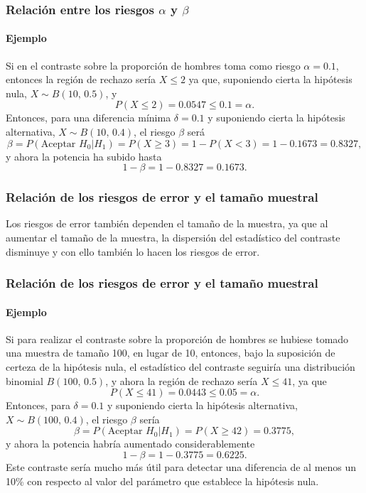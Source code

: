\begin{frame}
\frametitle{Relación entre los riesgos $\alpha$ y $\beta$}
\framesubtitle{Ejemplo}
Si en el contraste sobre la proporción de hombres toma como riesgo $\alpha=0.1$, entonces la región de rechazo sería $X\leq 2$ ya que, suponiendo cierta la hipótesis nula, $X\sim B(10,\, 0.5)$, y
\[
P(X\leq 2) = 0.0547 \leq 0.1=\alpha.
\]
Entonces, para una diferencia mínima $\delta=0.1$ y suponiendo cierta la hipótesis alternativa, $X\sim B(10,\,0.4)$, el riesgo $\beta$ será
\[
\beta = P(\text{Aceptar }H_0|H_1) = P(X\geq 3) = 1- P(X<3) = 1-0.1673 = 0.8327,
\]
y ahora la potencia ha subido hasta
\[
1-\beta = 1-0.8327 = 0.1673.
\]
\end{frame}


\begin{frame}
\frametitle{Relación de los riesgos de error y el tamaño muestral}
Los riesgos de error también dependen el tamaño de la muestra, ya que al aumentar el tamaño de la muestra, la dispersión del estadístico del contraste disminuye y con ello también lo hacen los riesgos de error.
\begin{center}
\end{center}
\end{frame}


\begin{frame}
\frametitle{Relación de los riesgos de error y el tamaño muestral}
\framesubtitle{Ejemplo}
Si para realizar el contraste sobre la proporción de hombres se hubiese tomado una muestra de tamaño 100, en lugar de 10, entonces, bajo la suposición de certeza de la hipótesis nula, el estadístico del contraste seguiría una distribución binomial $B(100,\,0.5)$, y ahora la región de rechazo sería $X\leq 41$, ya que
\[
P(X\leq 41) = 0.0443 \leq 0.05 =\alpha.
\]
Entonces, para $\delta=0.1$ y suponiendo cierta la hipótesis alternativa, $X\sim B(100,\,0.4)$, el riesgo $\beta$ sería
\[
\beta = P(\text{Aceptar }H_0|H_1) = P(X\geq 42) = 0.3775,
\]
y ahora la potencia habría aumentado considerablemente
\[
1-\beta = 1-0.3775 = 0.6225.
\]
Este contraste sería mucho más útil para detectar una diferencia de al menos un 10\% con respecto al valor del parámetro que establece la hipótesis nula.
\end{frame}


